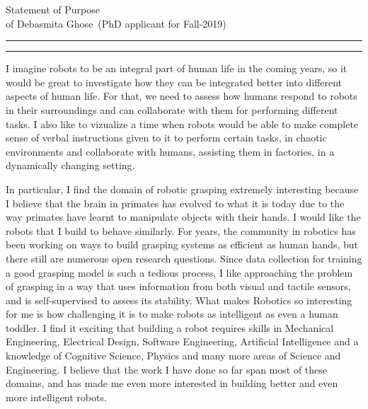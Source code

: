 \documentclass[10pt]{article}
\newcommand{\soptitle}{Statement of Purpose}
\newcommand{\yourname}{Debasmita Ghose}
\begin{document}
\begin{center}\LARGE\soptitle\\
\large of \yourname\ (PhD applicant for Fall-2019)
\end{center}

\hrule
\vspace{0pt}
\hrule height 1pt

\bigskip

I imagine robots to be an integral part of human life in the coming years, so it would be great to investigate how they can be integrated better into different aspects of human life. For that, we need to assess how humans respond to robots in their surroundings and can collaborate with them for performing different tasks. I also like to vizualize a time when robots would be able to make complete sense of verbal instructions given to it to perform certain tasks, in chaotic environments and collaborate with humans, assisting them in factories, in a dynamically changing setting.
\par
In particular, I find the domain of robotic grasping extremely interesting because I believe that the brain in primates has evolved to what it is today due to the way primates have learnt to manipulate objects with their hands. I would like the robots that I build to behave similarly. For years, the community in robotics has been working on ways to build grasping systems as efficient as  human hands, but there still are numerous open research questions. Since data collection for training a good grasping model is such a tedious process,  I like approaching the problem of grasping in a way that uses information from both visual and tactile sensors, and is self-supervised to assess its stability. What makes Robotics so interesting for me is how challenging it is to make robots as intelligent as even a human toddler. I find it exciting that building a robot requires skills in Mechanical Engineering, Electrical Design, Software Engineering, Artificial Intelligence and a knowledge of Cognitive Science, Physics and many more areas of Science and Engineering. I believe that the work I have done so far span most of these domains, and has made me even more interested in building better and even more intelligent robots.    
\par
\end{document}
